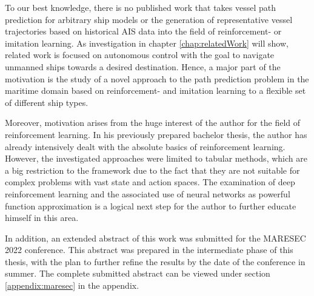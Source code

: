 To our best knowledge, there is no published work that takes vessel path prediction for arbitrary ship models or the generation of representative vessel trajectories based on historical AIS data into the field of reinforcement- or imitation learning. As investigation in chapter \ref{chap:relatedWork} will show, related work is focused on autonomous control with the goal to navigate unmanned ships towards a desired destination. Hence, a major part of the motivation is the study of a novel approach to the path prediction problem in the maritime domain based on reinforcement- and imitation learning to a flexible set of different ship types.
\par
Moreover, motivation arises from the huge interest of the author for the field of reinforcement learning. In his previously prepared bachelor thesis, the author has already intensively dealt with the absolute basics of reinforcement learning.  However, the investigated approaches were limited to tabular methods, which are a big restriction to the framework due to the fact that they are not suitable for complex problems with vast state and action spaces. The examination of deep reinforcement learning and the associated use of neural networks as powerful function approximation is a logical next step for the author to further educate himself in this area.
\par
In addition, an extended abstract of this work was submitted for the MARESEC 2022 conference. This abstract was prepared in the intermediate phase of this thesis, with the plan to further refine the results by the date of the conference in summer. The complete submitted abstract can be viewed under section \ref{appendix:maresec} in the appendix.